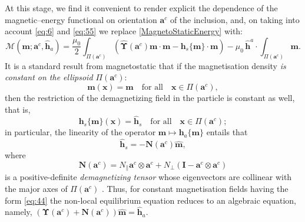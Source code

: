 \documentclass[oneside]{article}
\begin{document}
At this stage, we find it convenient to render explicit the dependence of the magnetic--energy functional on orientation $\bm a^c$ of the inclusion, and, on taking into account \eqref{eq:6} and \eqref{eq:55} we replace \eqref{MagnetoStaticEnergy} with:
\begin{equation}\label{MagnetoStaticEnergy2}
{\mathcal M}(\bm m;\bm a^c,\widehat{\bm h}_a)=\frac{\mu_0}2\int_{\Pi(\bm a^c)}\left(\widehat{\bm\Upsilon}(\bm a^c)\bm m\cdot\bm m-\bm h_s\{\bm m\}\cdot\bm m\right)-\mu_0\,\widehat{\bm h}^a\cdot\int_{\Pi(\bm a^c)}\bm m.
\end{equation}
It is  a standard result from magnetostatic that if the magnetisation density \emph{is constant on the ellipsoid $\Pi(\bm a^c)$}:
\begin{equation}\label{eq:44}
\bm m(\bm x)=\widehat{\bm m}\quad \text{for all}\quad\bm x\in\Pi(\bm a^c),
\end{equation}
then the restriction of the demagnetizing field in the particle is constant as well, that is,
\begin{equation}\label{eq:11}
\bm h_s\{\bm m\}(\bm x)=\widehat{\bm h}_s\quad \text{for all}\quad\bm x\in\Pi(\bm a^c);
\end{equation}
in particular, the linearity of the operator ${\bm m}\mapsto \bm h_a\{{\bm m}\}$ entails that 
\begin{equation}\label{eq:10}
\widehat{\bm h}_s=-\bm N(\bm a^c)\widehat{\bm m},
\end{equation}
where
\begin{equation}
\bm N(\bm a^c)=N_\parallel\bm a^c\otimes\bm a^c+N_\perp(\bm I-\bm a^c\otimes\bm a^c)
\label{NCur}
\end{equation}
is a positive-definite \emph{demagnetizing tensor} whose eigenvectors are collinear with the major axes of $\Pi(\bm a^c)$ \cite{bertotti}. Thus, for constant magnetisation fields having the form \eqref{eq:44} the non-local equilibrium equation reduces to an algebraic equation, namely, $(\bm\Upsilon(\bm a^c)+\bm N(\bm a^c))\widehat{\bm m}=\widehat{\bm h}_a$.
\end{document}
